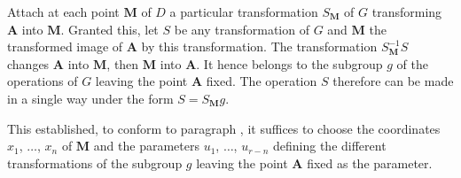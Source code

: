 Attach at each point $\mathbf{M}$ of $D$ a particular transformation $S_{\mathbf{M}}$ of $G$ transforming $\mathbf{A}$ into $\mathbf{M}$. Granted this, let $S$ be any transformation of $G$ and $\mathbf{M}$ the transformed image of $\mathbf{A}$ by this transformation. The transformation $S_{\mathbf{M}}^{-1}S$ changes $\mathbf{A}$ into $\mathbf{M}$, then $\mathbf{M}$ into $\mathbf{A}$. It hence belongs to the subgroup $g$ of the operations of $G$ leaving the point $\mathbf{A}$ fixed. The operation $S$ therefore can be made in a single way under the form $S=S_{\mathbf{M}}g$.

This established, to conform to paragraph , it suffices to choose the coordinates $x_{1}$, $\dots$, $x_{n}$ of $\mathbf{M}$ and the parameters $u_{1}$, $\dots$, $u_{r-n}$ defining the different transformations of the subgroup $g$ leaving the point $\mathbf{A}$ fixed as the parameter.

